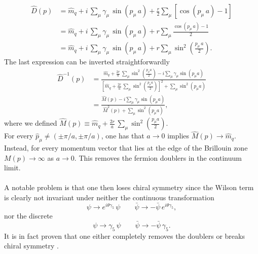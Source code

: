 \begin{equation*}
    \begin{aligned}
        \widehat{D}(p) &= \hat{m}_q + i \, \sum_\mu \gamma_\mu \, \sin\left( p_\mu \, a\right) + \frac{r}{2} \sum_\mu \left[\cos\left(p_\mu \, a\right) - 1\right] \\
        &= \hat{m}_q + i \, \sum_\mu \gamma_\mu \, \sin\left( p_\mu \, a\right) + r \sum_\mu \frac{\cos\left(p_\mu \, a\right) - 1}{2} \\
        &= \hat{m}_q + i \, \sum_\mu \gamma_\mu \, \sin\left( p_\mu \, a\right) + r \sum_\mu \sin^2\left(\frac{p_\mu \, a}{2}\right).
    \end{aligned}
\end{equation*}
The last expression can be inverted straightforwardly
\begin{equation*}
    \begin{aligned}
        \widehat{D}^{-1}(p) &= \frac{\hat{m}_q + \frac{2r}{a} \, \sum_\mu \sin ^2\left(\frac{p_\mu a}{2}\right) - i \sum_\mu \gamma_\mu \sin \left(p_\mu a\right)}{\left[\hat{m}_q + \frac{2r}{a} \, \sum_\mu \sin^2\left(\frac{p_\mu a}{2}\right)\right]^2 + \sum_\mu \sin^2 \left(p_\mu a\right)} \\
        &= \frac{\hat{M}(p) - i \sum_\mu \gamma_\mu \sin \left(p_\mu a\right)}{\hat{M}^2(p) + \sum_\mu \sin^2 \left(p_\mu a\right)},
    \end{aligned}
\end{equation*}
where we defined $\hat{M}(p) \equiv \hat{m}_q + \frac{2r}{a} \, \sum_\mu \sin ^2\left(\frac{p_\mu a}{2}\right)$. \\
For every $\hat p_\mu \neq (\pm \pi/a, \pm \pi/a)$, one has that $a \to 0$ implies $\hat{M}(p) \to \hat{m}_q$.\\
Instead, for every momentum vector that lies at the edge of the Brillouin zone $M(p) \to \infty$ as $a \to 0$. This removes the fermion doublers in the continuum limit. \\~\\
A notable problem is that one then loses chiral symmetry since the Wilson term is clearly not invariant under neither the continuous transformation
\begin{equation*}
    \psi \to e^{i \theta \gamma_5} \, \psi \qquad \bar\psi \to - \bar\psi \, e^{i \theta \gamma_5},
\end{equation*}
nor the discrete
\begin{equation*}
    \psi \to \gamma_5 \, \psi \qquad \bar\psi \to - \bar\psi \, \gamma_5.
\end{equation*}
It is in fact proven that one either completely removes the doublers or breaks chiral symmetry \cite{NIELSEN198120}.